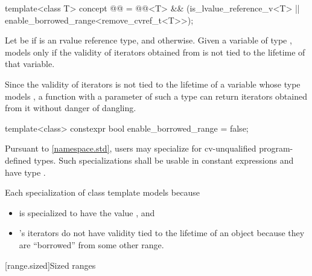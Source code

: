 \begin{itemdecl}
template<class T>
  concept @@ =
    @@<T> && (is_lvalue_reference_v<T> || enable_borrowed_range<remove_cvref_t<T>>);
\end{itemdecl}

\begin{itemdescr}
\pnum
Let  be 
if  is an rvalue reference type, and  otherwise.
Given a variable  of type ,
 models  only if
the validity of iterators obtained from 
is not tied to the lifetime of that variable.

\pnum
\begin{note}
Since the validity of iterators is not tied to the lifetime of
a variable whose type models ,
a function with a parameter of such a type can
return iterators obtained from it without danger of dangling.
\end{note}
\end{itemdescr}

%
\begin{itemdecl}
template<class>
  constexpr bool enable_borrowed_range = false;
\end{itemdecl}

\begin{itemdescr}
\pnum
\remarks
Pursuant to \ref{namespace.std}, users may specialize 
for cv-unqualified program-defined types.
Such specializations shall be
usable in constant expressions and
have type .

\pnum
\begin{example}
Each specialization  of class template 
models  because
\begin{itemize}
\item
{} is specialized
to have the value , and

\item
{}'s iterators
do not have validity tied to the lifetime of an  object
because they are ``borrowed'' from some other range.
\end{itemize}
\end{example}
\end{itemdescr}

[range.sized]{Sized ranges}

